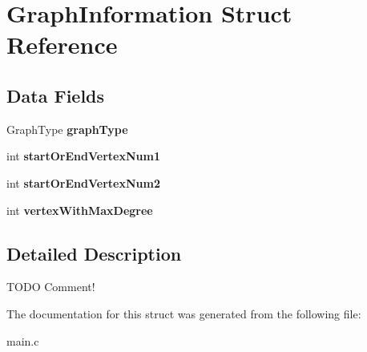 \hypertarget{structGraphInformation}{}\section{Graph\+Information Struct Reference}
\label{structGraphInformation}
\subsection*{Data Fields}
\begin{DoxyCompactItemize}
\item 
Graph\+Type {\bfseries graph\+Type}\hypertarget{structGraphInformation_a525b30e8a6065f7a4f586c3ec07312e6}{}\label{structGraphInformation_a525b30e8a6065f7a4f586c3ec07312e6}

\item 
int {\bfseries start\+Or\+End\+Vertex\+Num1}\hypertarget{structGraphInformation_a724f3a89e48c6fc29ba45e0df0b319e4}{}\label{structGraphInformation_a724f3a89e48c6fc29ba45e0df0b319e4}

\item 
int {\bfseries start\+Or\+End\+Vertex\+Num2}\hypertarget{structGraphInformation_a0833742e1c1241684231ad082661e514}{}\label{structGraphInformation_a0833742e1c1241684231ad082661e514}

\item 
int {\bfseries vertex\+With\+Max\+Degree}\hypertarget{structGraphInformation_aa5040463d22d2a57806c7276767f8371}{}\label{structGraphInformation_aa5040463d22d2a57806c7276767f8371}

\end{DoxyCompactItemize}


\subsection{Detailed Description}
T\+O\+DO Comment! 

The documentation for this struct was generated from the following file\+:\begin{DoxyCompactItemize}
\item 
main.\+c\end{DoxyCompactItemize}
